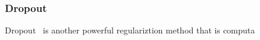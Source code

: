 \subsubsection{Dropout}

Dropout~\cite{JMLR:v15:srivastava14a} is another powerful regulariztion method that is computa